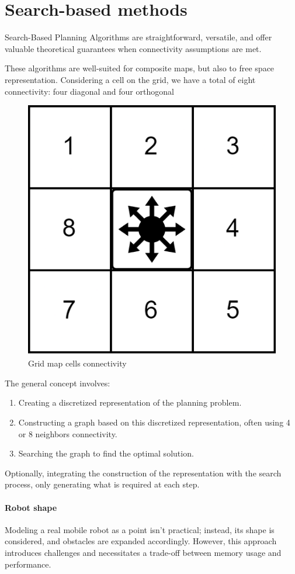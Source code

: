 \section{Search-based methods}

Search-Based Planning Algorithms are straightforward, versatile, and offer valuable theoretical guarantees when connectivity assumptions are met.

These algorithms are well-suited for composite maps, but also to free space representation. 
Considering a cell on the grid, we have a total of eight connectivity: four diagonal and four orthogonal
\begin{figure}[H]
    \centering
    \includegraphics[width=0.75\linewidth]{images/gmc.png}
    \caption{Grid map cells connectivity}
\end{figure}
The general concept involves:
\begin{enumerate}
    \item Creating a discretized representation of the planning problem.
    \item Constructing a graph based on this discretized representation, often using 4 or 8 neighbors connectivity.
    \item Searching the graph to find the optimal solution.
\end{enumerate}
Optionally, integrating the construction of the representation with the search process, only generating what is required at each step.

\paragraph*{Robot shape}
Modeling a real mobile robot as a point isn't practical; instead, its shape is considered, and obstacles are expanded accordingly. 
However, this approach introduces challenges and necessitates a trade-off between memory usage and performance.

